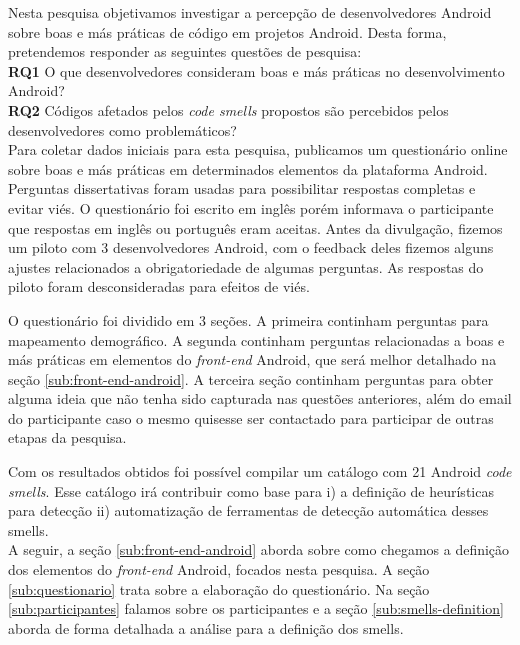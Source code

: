 Nesta pesquisa objetivamos investigar a percep\c{c}\~ao de desenvolvedores Android sobre boas e m\'as pr\'aticas de c\'odigo em projetos Android. Desta forma, pretendemos responder as seguintes quest\~oes de pesquisa: \\

\textbf{RQ1} O que desenvolvedores consideram boas e m\'as pr\'aticas no desenvolvimento Android? \\

\textbf{RQ2} C\'odigos afetados pelos \textit{code smells} propostos s\~ao percebidos pelos desenvolvedores como problem\'aticos? \\

Para coletar dados iniciais para esta pesquisa, publicamos um question\'ario online sobre boas e m\'as pr\'aticas em determinados elementos da plataforma Android. Perguntas dissertativas foram usadas para possibilitar respostas completas e evitar vi\'es. O question\'ario foi escrito em ingl\^es por\'em informava o participante que respostas em ingl\^es ou portugu\^es eram aceitas. Antes da divulga\c{c}\~ao, fizemos um piloto com 3 desenvolvedores Android, com o feedback deles fizemos alguns ajustes relacionados a obrigatoriedade de algumas perguntas. As respostas do piloto foram desconsideradas para efeitos de vi\'es. 

O question\'ario foi dividido em 3 se\c{c}\~oes. A primeira continham perguntas para mapeamento demogr\'afico. A segunda continham perguntas relacionadas a boas e m\'as pr\'aticas em elementos do \textit{front-end} Android, que ser\'a melhor detalhado na se\c{c}\~ao \ref{sub:front-end-android}. A terceira se\c{c}\~ao continham perguntas para obter alguma ideia que n\~ao tenha sido capturada nas quest\~oes anteriores, al\'em do email do participante caso o mesmo quisesse ser contactado para participar de outras etapas da pesquisa. 

Com os resultados obtidos foi poss\'ivel compilar um cat\'alogo com 21 Android \textit{code smells}. Esse cat\'alogo ir\'a contribuir como base para i) a defini\c{c}\~ao de heur\'isticas para detec\c{c}\~ao ii) automatiza\c{c}\~ao de ferramentas de detec\c{c}\~ao autom\'atica desses smells. \\

A seguir, a se\c{c}\~ao \ref{sub:front-end-android} aborda sobre como chegamos a defini\c{c}\~ao dos elementos do \textit{front-end} Android, focados nesta pesquisa. A se\c{c}\~ao \ref{sub:questionario} trata sobre a elabora\c{c}\~ao do question\'ario. Na se\c{c}\~ao \ref{sub:participantes} falamos sobre os participantes e a se\c{c}\~ao \ref{sub:smells-definition} aborda de forma detalhada a an\'alise para a defini\c{c}\~ao dos smells.


